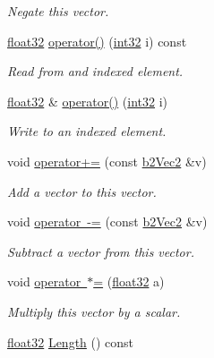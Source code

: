 \begin{DoxyCompactItemize}
\begin{DoxyCompactList}\small\item\em Negate this vector. \end{DoxyCompactList}\item 
\mbox{\hyperlink{b2_settings_8h_aacdc525d6f7bddb3ae95d5c311bd06a1}{float32}} \mbox{\hyperlink{structb2_vec2_a543b5264d17df35448632071f8ae7e4d}{operator()}} (\mbox{\hyperlink{b2_settings_8h_a43d43196463bde49cb067f5c20ab8481}{int32}} i) const
\begin{DoxyCompactList}\small\item\em Read from and indexed element. \end{DoxyCompactList}\item 
\mbox{\hyperlink{b2_settings_8h_aacdc525d6f7bddb3ae95d5c311bd06a1}{float32}} \& \mbox{\hyperlink{structb2_vec2_a50b39580d9f479e17b23ce3cb8efbac6}{operator()}} (\mbox{\hyperlink{b2_settings_8h_a43d43196463bde49cb067f5c20ab8481}{int32}} i)
\begin{DoxyCompactList}\small\item\em Write to an indexed element. \end{DoxyCompactList}\item 
void \mbox{\hyperlink{structb2_vec2_a590789342e22ac1e7f9c1a63a2778b6d}{operator+=}} (const \mbox{\hyperlink{structb2_vec2}{b2\+Vec2}} \&v)
\begin{DoxyCompactList}\small\item\em Add a vector to this vector. \end{DoxyCompactList}\item 
void \mbox{\hyperlink{structb2_vec2_ae1c8b9ce1ff5e1a266a26e6301d5a6c0}{operator -\/=}} (const \mbox{\hyperlink{structb2_vec2}{b2\+Vec2}} \&v)
\begin{DoxyCompactList}\small\item\em Subtract a vector from this vector. \end{DoxyCompactList}\item 
void \mbox{\hyperlink{structb2_vec2_a256c67f57abe2c40b1b83edc467b4b5a}{operator $\ast$=}} (\mbox{\hyperlink{b2_settings_8h_aacdc525d6f7bddb3ae95d5c311bd06a1}{float32}} a)
\begin{DoxyCompactList}\small\item\em Multiply this vector by a scalar. \end{DoxyCompactList}\item 
\mbox{\hyperlink{b2_settings_8h_aacdc525d6f7bddb3ae95d5c311bd06a1}{float32}} \mbox{\hyperlink{structb2_vec2_a04cb9ac9e845a59f4212b2d7149fa3d9}{Length}} () const

\end{DoxyCompactItemize}
